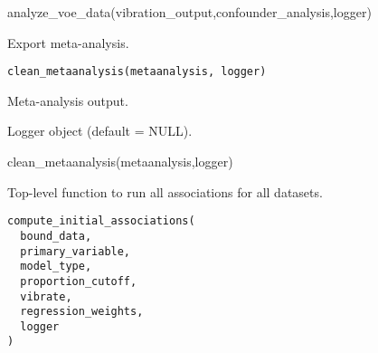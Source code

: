 \documentclass[a4paper]{book}
\begin{document}
%
\begin{Examples}
\begin{ExampleCode}
analyze_voe_data(vibration_output,confounder_analysis,logger)
\end{ExampleCode}
\end{Examples}
%
\begin{Description}\relax
Export meta-analysis.
\end{Description}
%
\begin{Usage}
\begin{verbatim}
clean_metaanalysis(metaanalysis, logger)
\end{verbatim}
\end{Usage}
%
\begin{Arguments}
\begin{ldescription}
\item[\code{metaanalysis}] Meta-analysis output.

\item[\code{logger}] Logger object (default = NULL).
\end{ldescription}
\end{Arguments}
%
\begin{Examples}
\begin{ExampleCode}
clean_metaanalysis(metaanalysis,logger)
\end{ExampleCode}
\end{Examples}
%
\begin{Description}\relax
Top-level function to run all associations for all datasets.
\end{Description}
%
\begin{Usage}
\begin{verbatim}
compute_initial_associations(
  bound_data,
  primary_variable,
  model_type,
  proportion_cutoff,
  vibrate,
  regression_weights,
  logger
)
\end{verbatim}
\end{Usage}
%
\end{document}

